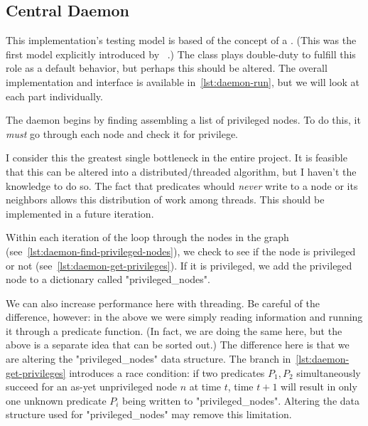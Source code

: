 \subsection{Central Daemon}
\label{sec:logic-repr:daemon}

This implementation's testing model is based of the concept of a .
(This was the first model explicitly introduced
  by \citeauthor{Dijkstra:1974:SSS:361179.361202}~\autocite{Dijkstra:1974:SSS:361179.361202}.)
The  class plays double-duty to fulfill this role as a default behavior,
  but perhaps this should be altered.
The overall implementation and interface is available in~\autoref{lst:daemon-run},
  but we will look at each part individually.

The daemon begins by finding assembling a list of privileged nodes.
To do this, it \emph{must} go through each node and check it for privilege.
\begin{warning}
  I consider this the greatest single bottleneck in the entire project.
  It is feasible that this can be altered into a distributed\slash threaded algorithm,
    but I haven't the knowledge to do so.
  The fact that predicates whould \emph{never} write to a node or its neighbors
    allows this distribution of work among threads.
  This should be implemented in a future iteration.
\end{warning}

Within each iteration of the loop through the nodes in the graph
  (see~\autoref{lst:daemon-find-privileged-nodes}),
  we check to see if the node is privileged or not
  (see~\autoref{lst:daemon-get-privileges}).
If it is privileged, we add the privileged node to a dictionary called "privileged_nodes".
\begin{warning}[2]
  We can also increase performance here with threading.
  Be careful of the difference, however:
    in the above we were simply reading information and
    running it through a predicate function.
  (In fact, we are doing the same here,
    but the above is a separate idea that can be sorted out.)
  The difference here is that we are altering the "privileged_nodes" data structure.
  The branch in~\autoref{lst:daemon-get-privileges} introduces a race condition:
    if two predicates $P_1, P_2$ simultaneously succeed for
    an as-yet unprivileged node $n$ at time $t$,
    time $t+1$ will result in only one unknown predicate
    $P_i$ being written to "privileged_nodes".
  Altering the data structure used for "privileged_nodes" may remove this limitation.
\end{warning}
